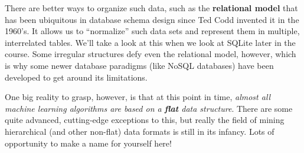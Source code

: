 There are better ways to organize such data, such as the \textbf{relational
model} that has been ubiquitous in database schema design since Ted Codd
invented it in the 1960's. It allows us to ``normalize'' such data sets and
represent them in multiple, interrelated tables. We'll take a look at this
when we look at SQLite later in the course. Some irregular structures defy
even the relational model, however, which is why some newer database paradigms
(like NoSQL databases) have been developed to get around its limitations.

One big reality to grasp, however, is that at this point in time,
\textit{almost all machine learning algorithms are based on a \textbf{flat}
data structure}. There are some quite advanced, cutting-edge exceptions to
this, but really the field of mining hierarchical (and other non-flat) data
formats is still in its infancy. Lots of opportunity to make a name for
yourself here!
